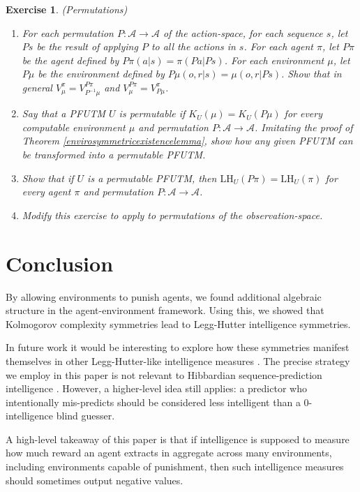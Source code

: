 \documentclass{article}
\newtheorem{exercise}[theorem]{Exercise}
\def\LH{\textrm{LH}}
\begin{document}
\begin{exercise} (Permutations)
    \begin{enumerate}
        \item
        For each permutation $P:\mathcal A\to\mathcal A$ of the action-space,
        for each sequence $s$,
        let $Ps$ be the result of applying $P$ to all the actions in $s$.
        For each agent $\pi$, let $P\pi$ be the agent defined by
        $P\pi(a|s)=\pi(Pa|Ps)$. For each environment $\mu$, let
        $P\mu$ be the environment defined by
        $P\mu(o,r|s)=\mu(o,r|Ps)$. Show that in general
        $V^\pi_\mu = V^{P\pi}_{P^{-1}\mu}$
        and
        $V^{P\pi}_\mu = V^\pi_{P\mu}$.
        \item
        Say that a PFUTM $U$ is \emph{permutable} if
        $K_U(\mu)=K_U(P\mu)$ for every computable environment $\mu$
        and permutation $P:\mathcal A\to\mathcal A$. Imitating the proof of
        Theorem \ref{envirosymmetricexistencelemma}, show how any given
        PFUTM can be transformed into a permutable PFUTM.
        \item
        Show that if $U$ is a permutable PFUTM, then $\LH_U(P\pi)=\LH_U(\pi)$
        for every agent $\pi$ and permutation $P:\mathcal A\to\mathcal A$.
        \item
        Modify this exercise to apply to permutations
        of the observation-space.
    \end{enumerate}
\end{exercise}

\section{Conclusion}
\label{conclusionsecn}

By allowing environments to punish agents,
we found additional algebraic structure in the agent-environment
framework. Using this, we showed
that Kolmogorov complexity symmetries lead to
Legg-Hutter intelligence symmetries.

In future work it would be interesting to explore how these symmetries
manifest themselves in other Legg-Hutter-like intelligence measures
\cite{gavane} \cite{hernandez}.
The precise strategy we employ in this
paper is not relevant to Hibbardian sequence-prediction intelligence
\cite{hibbard} \cite{alexander2021measuring}. However, a higher-level
idea still applies:
a predictor who intentionally mis-predicts
should be considered less intelligent than a $0$-intelligence blind guesser.

A high-level takeaway of
this paper is that if intelligence is supposed to measure how much
reward an agent extracts in aggregate across many environments,
including environments capable of punishment, then such
intelligence measures should sometimes output negative
values.




\end{document}
